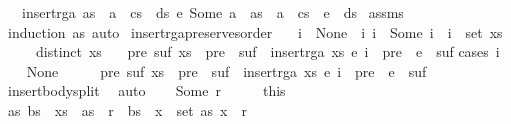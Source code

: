 \begin{isabellebody}
\ \ \ {\isachardoublequoteopen}insert{\isacharunderscore}rga\ {\isacharparenleft}as\ {\isacharat}\ a\ {\isacharhash}\ cs\ {\isacharat}\ ds{\isacharparenright}\ {\isacharparenleft}e{\isacharcomma}\ Some\ a{\isacharparenright}\ {\isacharequal}\ as\ {\isacharat}\ a\ {\isacharhash}\ cs\ {\isacharat}\ e\ {\isacharhash}\ ds{\isachardoublequoteclose}\isanewline
%
\isadelimproof
%
\endisadelimproof
%
\isatagproof
{}\isamarkupfalse%
\ assms\ \isamarkupfalse%
\ {\isacharparenleft}induction\ as{\isacharsemicolon}\ auto{\isacharparenright}%
\endisatagproof
{\isafoldproof}%
%
\isadelimproof
\isanewline
%
\endisadelimproof
\isanewline
{}\isamarkupfalse%
\ insert{\isacharunderscore}rga{\isacharunderscore}preserves{\isacharunderscore}order{\isacharcolon}\isanewline
\ \ \ {\isachardoublequoteopen}i\ {\isacharequal}\ None\ {\isasymor}\ {\isacharparenleft}{\isasymexists}i{\isacharprime}{\isachardot}\ i\ {\isacharequal}\ Some\ i{\isacharprime}\ {\isasymand}\ i{\isacharprime}\ {\isasymin}\ set\ xs{\isacharparenright}{\isachardoublequoteclose}\isanewline
\ \ \ \ \ {\isachardoublequoteopen}distinct\ xs{\isachardoublequoteclose}\isanewline
\ \ \ {\isachardoublequoteopen}{\isasymexists}pre\ suf{\isachardot}\ xs\ {\isacharequal}\ pre\ {\isacharat}\ suf\ {\isasymand}\ insert{\isacharunderscore}rga\ xs\ {\isacharparenleft}e{\isacharcomma}\ i{\isacharparenright}\ {\isacharequal}\ pre\ {\isacharat}\ e\ {\isacharhash}\ suf{\isachardoublequoteclose}\isanewline
%
\isadelimproof
%
\endisadelimproof
%
\isatagproof
{}\isamarkupfalse%
{\isacharparenleft}cases\ i{\isacharparenright}\isanewline
\ \ \isamarkupfalse%
\ None\isanewline
\ \ \isamarkupfalse%
\ \isamarkupfalse%
\ {\isachardoublequoteopen}{\isasymexists}pre\ suf{\isachardot}\ xs\ {\isacharequal}\ pre\ {\isacharat}\ suf\ {\isasymand}\ insert{\isacharunderscore}rga\ xs\ {\isacharparenleft}e{\isacharcomma}\ i{\isacharparenright}\ {\isacharequal}\ pre\ {\isacharat}\ e\ {\isacharhash}\ suf{\isachardoublequoteclose}\isanewline
\ \ \ \ \isamarkupfalse%
\ insert{\isacharunderscore}body{\isacharunderscore}split\ \isamarkupfalse%
\ auto\isanewline
{}\isamarkupfalse%
\isanewline
\ \ \isamarkupfalse%
\ {\isacharparenleft}Some\ r{\isacharparenright}\isanewline
\ \ \isamarkupfalse%
\ \isamarkupfalse%
\ this\ \isamarkupfalse%
\ as\ bs\ \ {\isachardoublequoteopen}xs\ {\isacharequal}\ as\ {\isacharat}\ r\ {\isacharhash}\ bs\ {\isasymand}\ {\isacharparenleft}{\isasymforall}x\ {\isasymin}\ set\ as{\isachardot}\ x\ {\isasymnoteq}\ r{\isacharparenright}{\isachardoublequoteclose}\isanewline

\end{isabellebody}

